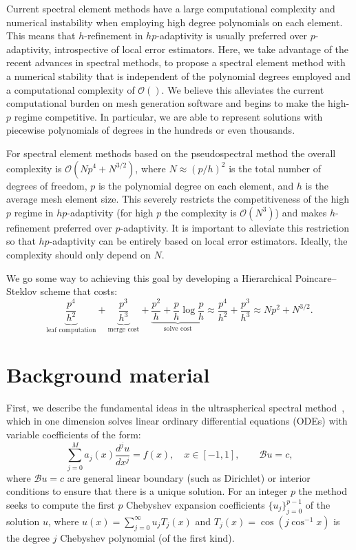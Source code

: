 \documentclass[11pt,a4paper,review]{siamart171218}
\begin{document}
 
Current spectral element methods have a large computational complexity and numerical instability when employing high degree polynomials on each element. This means that $h$-refinement in $hp$-adaptivity is usually preferred over $p$-adaptivity, introspective of local error estimators. Here, we take advantage of the recent advances in spectral methods, to propose a spectral element method with a numerical stability that is independent of the polynomial degrees employed and a computational complexity of $\mathcal{O}()$. We believe this alleviates the current computational burden on mesh generation software and begins to make the high-$p$ regime competitive. In particular, we are able to represent solutions with piecewise polynomials of degrees in the hundreds or even thousands. 


For spectral element methods based on the pseudospectral method the overall complexity is $\mathcal{O}(Np^4 + N^{3/2})$, where $N \approx (p/h)^2$ is the total number of degrees of freedom, $p$ is the polynomial degree on each element, and $h$ is the average mesh element size. This  severely restricts the competitiveness of the high $p$ regime in $hp$-adaptivity (for high $p$ the complexity is $\mathcal{O}(N^3)$) and makes $h$-refinement preferred over $p$-adaptivity. It is important to alleviate this restriction so that $hp$-adaptivity can be entirely based on local error estimators. Ideally, the complexity should only depend on $N$.

We go some way to achieving this goal by developing a Hierarchical Poincare--Steklov scheme that costs:
\[
 \underbrace{\frac{p^4}{h^2}}_{\text{leaf computation}} + \underbrace{\frac{p^3}{h^3}}_{\text{merge cost}} + \underbrace{\frac{p^2}{h} + \frac{p}{h}\log \frac{p}{h}}_{\text{solve cost}} \approx \frac{p^4}{h^2} + \frac{p^3}{h^3} \approx Np^2 + N^{3/2}. 
\]


\section{Background material}\label{sec:background}
First, we describe the fundamental ideas in the ultraspherical spectral method~\cite{Olver_13_01}, which in one dimension solves linear ordinary differential equations (ODEs) with variable coefficients of the form: 
\[
\sum_{j=0}^M a_j(x)\frac{d^ju}{dx^j} = f(x), \quad x\in[-1,1], \qquad \mathcal{B}u = c, 
\]
where $\mathcal{B}u=c$ are general linear boundary (such as Dirichlet) or interior conditions to ensure that there is a unique solution. For an integer $p$ the method seeks to compute the first $p$ Chebyshev expansion coefficients $\{u_j\}_{j=0}^{p-1}$ of the solution $u$, where $u(x) = \sum_{j=0}^\infty u_j T_j(x)$ and $T_j(x) = \cos(j\cos^{-1}x)$ is the degree $j$ Chebyshev polynomial (of the first kind). 
\end{document}
